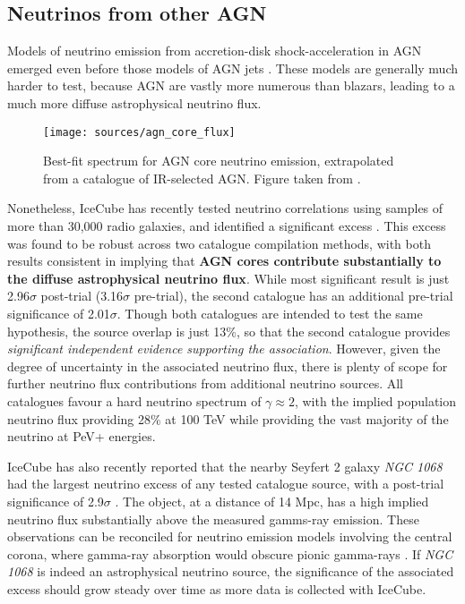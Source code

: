 \subsection*{Neutrinos from other AGN}

Models of neutrino emission from accretion-disk shock-acceleration in AGN emerged even before those models of AGN jets . These models are generally much harder to test, because AGN are vastly more numerous than blazars, leading to a much more diffuse astrophysical neutrino flux. 

\begin{figure}[!ht]
	\centering \texttt{[image: sources/agn\_core\_flux]}
	\caption{Best-fit spectrum for AGN core neutrino emission, extrapolated from a catalogue of IR-selected AGN. Figure taken from \cite{federica_thesis}.}
	\label{fig:agn_core_flux}
\end{figure}

Nonetheless, IceCube has recently tested neutrino correlations using samples of more than 30,000 radio galaxies, and identified a significant excess . This excess was found to be robust across two catalogue compilation methods, with both results consistent in implying that \textbf{AGN cores contribute substantially to the diffuse astrophysical neutrino flux}. While most significant result is just 2.96$\sigma$ post-trial (3.16$\sigma$ pre-trial), the second catalogue has an additional pre-trial significance of 2.01$\sigma$. Though both catalogues are intended to test the same hypothesis, the source overlap is just 13\%, so that the second catalogue provides \emph{significant independent evidence supporting the association}. However, given the degree of uncertainty in the associated neutrino flux, there is plenty of scope for further neutrino flux contributions from additional neutrino sources. All catalogues favour a hard neutrino spectrum of $\gamma \approx 2$, with the implied population neutrino flux providing 28\% at 100 TeV while providing the vast majority of the neutrino at PeV+ energies.


IceCube has also recently reported that the nearby Seyfert 2 galaxy \emph{NGC 1068} had the largest neutrino excess of any tested catalogue source, with a post-trial significance of 2.9$\sigma$ . The object, at a distance of 14 Mpc, has a high implied neutrino flux substantially above the measured gamms-ray emission. These observations can be reconciled for neutrino emission models involving the central corona, where gamma-ray absorption would obscure pionic gamma-rays . If \emph{NGC 1068} is indeed an astrophysical neutrino source, the significance of the associated excess should grow steady over time as more data is collected with IceCube.

